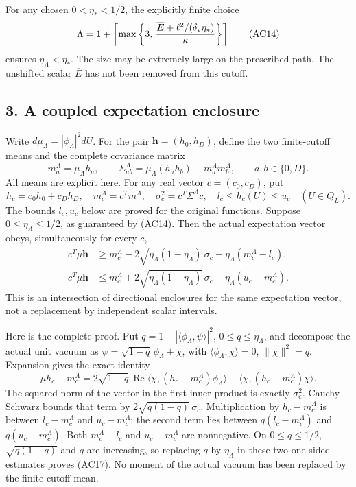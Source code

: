 \documentclass[11pt]{article}
\begin{document}
For any chosen \(0<\eta_*<1/2\), the explicitly finite choice
\[
 \Lambda=1+\left\lceil\max\left\{3,\,
      \frac{\overline E+\ell^2/(\delta_{\rm v}\eta_*)}{\kappa}\right\}\right\rceil
 \tag{AC14}
\]
ensures \(\eta_\Lambda<\eta_*\). The size may be extremely large on the prescribed path. The unshifted scalar \(\overline E\) has not been removed from this cutoff.

\subsection*{3. A coupled expectation enclosure}

Write \(d\mu_\Lambda=|\phi_\Lambda|^2dU\). For the pair \(\mathbf h=(h_0,h_D)\), define the two finite-cutoff means and the complete covariance matrix
\[
 m_a^\Lambda=\mu_\Lambda h_a,\qquad
 \Sigma_{ab}^\Lambda
   =\mu_\Lambda(h_ah_b)-m_a^\Lambda m_b^\Lambda,\qquad
 a,b\in\{0,D\}.
 \tag{AC15}
\]
All means are explicit here. For any real vector \(c=(c_0,c_D)\), put
\[
 h_c=c_0h_0+c_Dh_D,\quad m_c^\Lambda=c^Tm^\Lambda,\quad
 \sigma_c^2=c^T\Sigma^\Lambda c,\quad
 l_c\le h_c(U)\le u_c\quad(U\in Q_L).
 \tag{AC16}
\]
The bounds \(l_c,u_c\) below are proved for the original functions. Suppose \(0\le\eta_\Lambda\le1/2\), as guaranteed by (AC14). Then the actual expectation vector obeys, simultaneously for every \(c\),
\[
 \boxed{\begin{aligned}
 c^T\mu\mathbf h
 &\ge m_c^\Lambda
       -2\sqrt{\eta_\Lambda(1-\eta_\Lambda)}\,\sigma_c
       -\eta_\Lambda(m_c^\Lambda-l_c),\\
 c^T\mu\mathbf h
 &\le m_c^\Lambda
       +2\sqrt{\eta_\Lambda(1-\eta_\Lambda)}\,\sigma_c
       +\eta_\Lambda(u_c-m_c^\Lambda).
 \end{aligned}}\tag{AC17}
\]
This is an intersection of directional enclosures for the same expectation vector, not a replacement by independent scalar intervals.

Here is the complete proof. Put \(q=1-|\langle\phi_\Lambda,\psi\rangle|^2\), \(0\le q\le\eta_\Lambda\), and decompose the actual unit vacuum as
\(\psi=\sqrt{1-q}\,\phi_\Lambda+\chi\), with \(\langle\phi_\Lambda,\chi\rangle=0\), \(\|\chi\|^2=q\). Expansion gives the exact identity
\[
 \mu h_c-m_c^\Lambda
 =2\sqrt{1-q}\,\operatorname{Re}
       \langle\chi,(h_c-m_c^\Lambda)\phi_\Lambda\rangle
       +\langle\chi,(h_c-m_c^\Lambda)\chi\rangle.
 \tag{AC18}
\]
The squared norm of the vector in the first inner product is exactly \(\sigma_c^2\). Cauchy–Schwarz bounds that term by \(2\sqrt{q(1-q)}\,\sigma_c\). Multiplication by \(h_c-m_c^\Lambda\) is between \(l_c-m_c^\Lambda\) and \(u_c-m_c^\Lambda\); the second term lies between \(q(l_c-m_c^\Lambda)\) and \(q(u_c-m_c^\Lambda)\). Both \(m_c^\Lambda-l_c\) and \(u_c-m_c^\Lambda\) are nonnegative. On \(0\le q\le1/2\), \(\sqrt{q(1-q)}\) and \(q\) are increasing, so replacing \(q\) by \(\eta_\Lambda\) in these two one-sided estimates proves (AC17). No moment of the actual vacuum has been replaced by the finite-cutoff mean.
\end{document}
